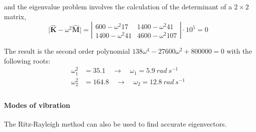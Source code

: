 and the eigenvalue problem involves the calculation of the determinant of a $2\times2$ matrix,
$$
\vert \hat{\mathbf{K}} - \omega^2 \hat{\mathbf{M}} \vert =
\left\vert \begin{matrix}
    600 -\omega^2 17 & 1400 -\omega^2 41 \\
    1400 -\omega^2 41 & 4600 -\omega^2 107
\end{matrix}
\right\vert \cdot 10^5 = 0
$$

The result is the second order polynomial
$
138 \omega^4 - 27600 \omega^2 + 800000 = 0
$ with the following roots:
\begin{align*}
\omega_1^2& = 35.1 \quad \rightarrow \quad \omega_1 = 5.9\ rad\ s^{-1} \\
\omega_2^2& = 164.8 \quad \rightarrow \quad \omega_2 = 12.8\ rad\ s^{-1} \\
\end{align*}


\paragraph{Modes of vibration} The Ritz-Rayleigh method can also be used to find accurate eigenvectors.
